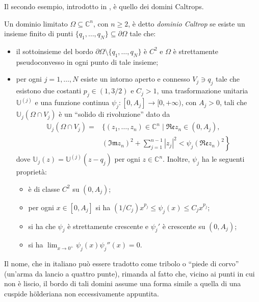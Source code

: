 Il secondo esempio, introdotto in \cite{BM}, è quello dei domini Caltrops.

\begin{defn} \label{defcaltrop}
    Un dominio limitato $\Omega\subseteq\mathbb{C}^n$, con $n\ge 2$, è detto \textit{dominio Caltrop} se esiste un insieme finito di punti $\{q_1,\dots,q_N\}\subseteq\partial\Omega$ tale che:
    \begin{itemize}
        \item il sottoinsieme del bordo $\partial\Omega\setminus\{q_1,\dots,q_N\}$ è $C^2$ e $\Omega$ è strettamente pseudoconvesso in ogni punto di tale insieme;
        \item per ogni $j=1,\dots, N$ esiste un intorno aperto e connesso $V_j\ni q_j$ tale che esistono due costanti $p_j\in(1,3/2)$ e $C_j>1$, una trasformazione unitaria $\mathbb{U}^{(j)}$ e una funzione continua $\psi_j:[0,A_j]\longrightarrow[0,+\infty)$, con $A_j>0$, tali che $\mathbb{U}_j(\Omega\cap V_j)$ è un ``solido di rivoluzione'' dato da
        \begin{align*}
            \mathbb{U}_j(\Omega\cap V_j)=&\Bigg\{(z_1,\dots,z_n)\in\mathbb{C}^n\mid \mathfrak{Re}z_n\in (0,A_j),\\
            &\left.(\mathfrak{Im}z_n)^2+\sum_{j=1}^{n-1}|z_j|^2<\psi_j(\mathfrak{Re}z_n)^2\right\}
        \end{align*}
        dove $\mathbb{U}_j(z)=\mathbb{U}^{(j)}(z-q_j)$ per ogni $z\in\mathbb{C}^n$. Inoltre, $\psi_j$ ha le seguenti proprietà:
        \begin{itemize}
            \item è di classe $C^2$ su $(0,A_j)$;
            \item per ogni $x\in[0,A_j]$ si ha $(1/C_j)x^{p_j} \le \psi_j(x) \le C_jx^{p_j}$;
            \item si ha che $\psi_j$ è strettamente crescente e $\psi_j'$ è crescente su $(0,A_j)$;
            \item si ha $\displaystyle\lim_{x\longrightarrow0^+}\psi_j(x)\psi_j''(x)=0$.
        \end{itemize}
    \end{itemize}
\end{defn}

\begin{oss}
    Il nome, che in italiano può essere tradotto come tribolo o ``piede di corvo'' (un'arma da lancio a quattro punte), rimanda al fatto che, vicino ai punti in cui non è liscio, il bordo di tali domini assume una forma simile a quella di una cuspide hölderiana non eccessivamente appuntita.
\end{oss}

